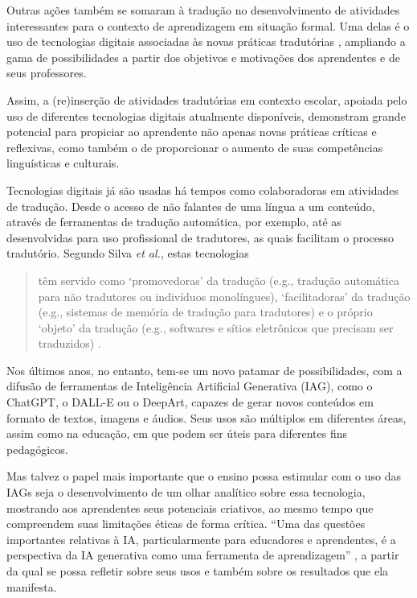 \documentclass[portuguese]{textolivre}
\begin{document}
Outras ações também se somaram à tradução no desenvolvimento de atividades interessantes para o contexto de aprendizagem em situação formal. Uma delas é o uso de tecnologias digitais associadas às novas práticas tradutórias \cite{bergmann2019}, ampliando a gama de possibilidades a partir dos objetivos e motivações dos aprendentes e de seus professores.

Assim, a (re)inserção de atividades tradutórias em contexto escolar, apoiada pelo uso de diferentes tecnologias digitais atualmente disponíveis, demonstram grande potencial para propiciar ao aprendente não apenas novas práticas críticas e reflexivas, como também o de proporcionar o aumento de suas competências linguísticas e culturais.

Tecnologias digitais já são usadas há tempos como colaboradoras em atividades de tradução. Desde o acesso de não falantes de uma língua a um conteúdo, através de ferramentas de tradução automática, por exemplo, até as desenvolvidas para uso profissional de tradutores, as quais facilitam o processo tradutório. Segundo Silva \textit{et al.}, estas tecnologias

\begin{quote}
têm servido como ‘promovedoras’ da tradução (e.g., tradução automática para não tradutores ou indivíduos monolíngues), ‘facilitadoras’ da tradução (e.g., sistemas de memória de tradução para tradutores) e o próprio ‘objeto’ da tradução (e.g., softwares e sítios eletrônicos que precisam ser traduzidos) \cite[p. 6]{silva2020}.
\end{quote}

Nos últimos anos, no entanto, tem-se um novo patamar de possibilidades, com a difusão de ferramentas de Inteligência Artificial Generativa (IAG), como o ChatGPT, o DALL-E ou o DeepArt, capazes de gerar novos conteúdos em formato de textos, imagens e áudios. Seus usos são múltiplos em diferentes áreas, assim como na educação, em que podem ser úteis para diferentes fins pedagógicos.

Mas talvez o papel mais importante que o ensino possa estimular com o uso das IAGs seja o desenvolvimento de um olhar analítico sobre essa tecnologia, mostrando aos aprendentes seus potenciais criativos, ao mesmo tempo que compreendem suas limitações éticas de forma crítica. “Uma das questões importantes relativas à IA, particularmente para educadores e aprendentes, é a perspectiva da IA generativa como uma ferramenta de aprendizagem” \cite[p. 28]{correia2024}, a partir da qual se possa refletir sobre seus usos e também sobre os resultados que ela manifesta.
\end{document}
